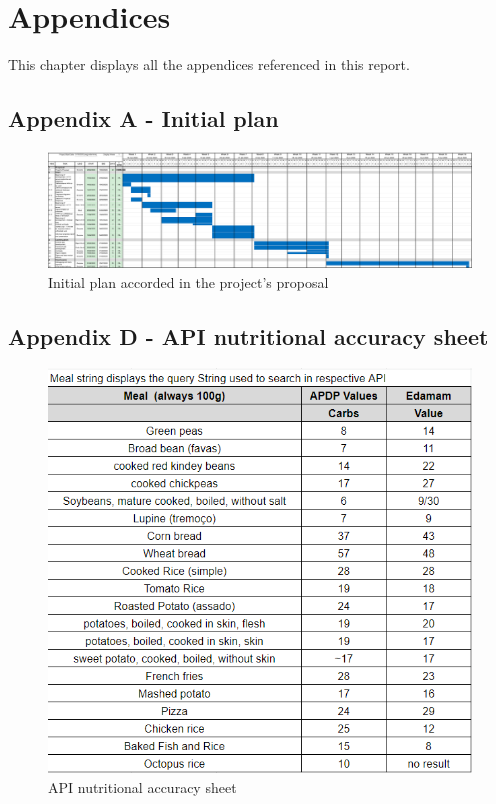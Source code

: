 %
%

\chapter{Appendices}

This chapter displays all the appendices referenced in this report.

\begin{landscape}
    \appendix    
    \section*{Appendix A - Initial plan}
    \label{app:initial_plan}
    \vspace{20mm}
    \begin{figure}[H]        
        \includegraphics[scale=0.3]{_figures/Project_initial_plan.eps}
        \caption{Initial plan accorded in the project's proposal}
    \end{figure}  
\end{landscape}

\appendix


\begin{landscape}
    \appendix
    
\end{landscape}

\appendix
\section*{Appendix D - API nutritional accuracy sheet}
\begin{figure}[H] 
    \begin{center}
        \includegraphics[scale=1]{_figures/api_nutritional_accuracy.png}
        \caption{API nutritional accuracy sheet}
    \end{center}       
\end{figure}
